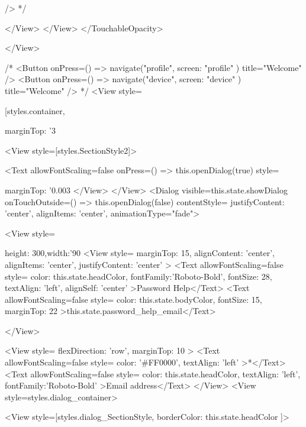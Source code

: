 {{{{{{{{{{{{{               /> */}

                    </View>
                  </View>
                </TouchableOpacity>

              </View>


              {/*   <Button
              onPress={() => navigate("profile", { screen: "profile" })}
              title="Welcome"
              /> 
              <Button
              onPress={() => navigate("device", { screen: "device" })}
              title="Welcome"
              /> */}
              <View style={[styles.container, { marginTop: '3%


                <View style={[styles.SectionStyle2]}>

                  <Text allowFontScaling={false} onPress={() => this.openDialog(true)} style={{ marginTop: '0.003%
                </View>
              </View>
              <Dialog visible={this.state.showDialog}
                onTouchOutside={() => this.openDialog(false)}
                contentStyle={{ justifyContent: 'center', alignItems: 'center', }}
                animationType="fade">


                <View style={{ height: 300,width:'90%
                  <View style={{ marginTop: 15, alignContent: 'center', alignItems: 'center', justifyContent: 'center' }}>
                    <Text allowFontScaling={false} style={{ color: this.state.headColor, fontFamily:'Roboto-Bold', fontSize: 28, textAlign: 'left', alignSelf: 'center' }}>Password Help</Text>
                    <Text allowFontScaling={false} style={{  color: this.state.bodyColor, fontSize: 15, marginTop: 22 }}>{this.state.password_help_email}</Text>


                  </View>

                  <View style={{ flexDirection: 'row', marginTop: 10 }}>
                    <Text allowFontScaling={false} style={{ color: '#FF0000', textAlign: 'left' }}>*</Text>
                    <Text allowFontScaling={false} style={{ color: this.state.headColor, textAlign: 'left', fontFamily:'Roboto-Bold' }}>Email address</Text>
                  </View>
                  <View style={styles.dialog_container}>


                    <View style={[styles.dialog_SectionStyle, { borderColor: this.state.headColor }]}>

}}}}}}}}}}}}}}}}}}
